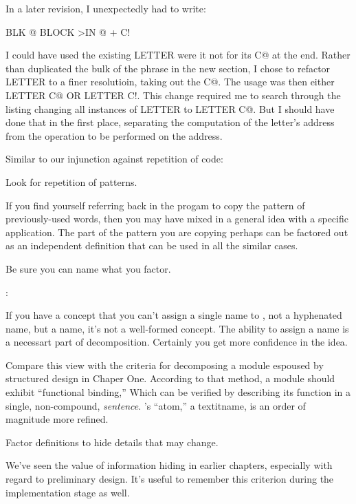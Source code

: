 In a later revision, I unexpectedly had to write:

\begin{Code}
BLK @ BLOCK  >IN @ +  C!
\end{Code}
I could have used the existing LETTER were it not for its C@ at the end. Rather than duplicated the bulk of the phrase in the new section, I chose to refactor LETTER to a finer resolutioin, taking out the C@. The usage was then either LETTER C@ OR LETTER C!. This change required me to search through the listing changing all instances of LETTER to LETTER C@. But I should have done that in the first place, separating the computation of the letter's address from the operation to be performed on the address.

Similar to our injunction against repetition of code:

\begin{tip}
Look for repetition of patterns.
\end{tip}
If you find yourself referring back in the progam to copy the pattern of previously-used words, then you may have mixed in a general idea with a specific application. The part of the pattern you are copying perhaps can be factored out as an independent definition that can be used in all the similar cases.

\begin{tip}
Be sure you can name what you factor.
\end{tip}

\medbreak
\begin{interview}
:
\begin{tfquot}
If you have a concept that you can't assign a single name to , not a hyphenated name, but a name, it's not a well-formed concept. The ability to assign a name is a necessart part of decomposition. Certainly you get more confidence in the idea.
\end{tfquot}
\end{interview}
Compare this view with the criteria for decomposing a module espoused by structured design in Chaper One. According to that method, a module should exhibit ``functional binding,'' Which can be verified by describing its function in a single, non-compound, \emph{sentence}. \Forth{}'s ``atom,'' a textit{name}, is an order of magnitude more refined.

\begin{tip}
Factor definitions to hide details that may change.
\end{tip}
We've seen the value of information hiding in earlier chapters, especially with regard to preliminary design. It's useful to remember this criterion during the implementation stage as well.

